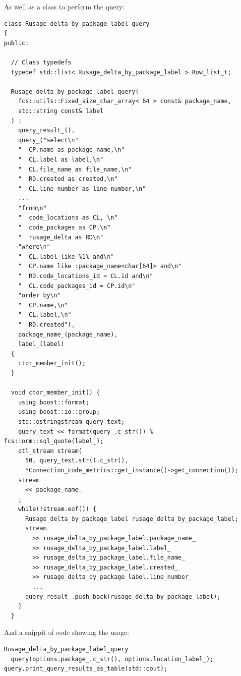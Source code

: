 \documentclass[11pt]{article}
\begin{document}
  
\pagebreak
    As well as a class to perform the query:


\lstset{language=C++}
\begin{lstlisting}
class Rusage_delta_by_package_label_query 
{
public:

  // Class typedefs
  typedef std::list< Rusage_delta_by_package_label > Row_list_t;

  Rusage_delta_by_package_label_query(
    fcs::utils::Fixed_size_char_array< 64 > const& package_name,
    std::string const& label
  ) :
    query_result_(),
    query_("select\n"
    "  CP.name as package_name,\n"
    "  CL.label as label,\n"
    "  CL.file_name as file_name,\n"
    "  RD.created as created,\n"
    "  CL.line_number as line_number,\n"
    ...
    "from\n"
    "  code_locations as CL, \n"
    "  code_packages as CP,\n"
    "  rusage_delta as RD\n"
    "where\n"
    "  CL.label like %1% and\n"
    "  CP.name like :package_name<char[64]> and\n"
    "  RD.code_locations_id = CL.id and\n"
    "  CL.code_packages_id = CP.id\n"
    "order by\n"
    "  CP.name,\n"
    "  CL.label,\n"
    "  RD.created"),
    package_name_(package_name),
    label_(label)
  {
    ctor_member_init();
  }

  void ctor_member_init() {
    using boost::format;
    using boost::io::group;
    std::ostringstream query_text;
    query_text << format(query_.c_str()) % fcs::orm::sql_quote(label_);
    otl_stream stream(
      50, query_text.str().c_str(),
      *Connection_code_metrics::get_instance()->get_connection());
    stream 
      << package_name_
    ;
    while(!stream.eof()) {
      Rusage_delta_by_package_label rusage_delta_by_package_label;
      stream
        >> rusage_delta_by_package_label.package_name_
        >> rusage_delta_by_package_label.label_
        >> rusage_delta_by_package_label.file_name_
        >> rusage_delta_by_package_label.created_
        >> rusage_delta_by_package_label.line_number_
        ...
      query_result_.push_back(rusage_delta_by_package_label);
    }
  }
\end{lstlisting}


    
\pagebreak

    And a snippit of code showing the usage:


\lstset{language=C++}
\begin{lstlisting}
Rusage_delta_by_package_label_query 
  query(options.package_.c_str(), options.location_label_);
query.print_query_results_as_table(std::cout);
\end{lstlisting}
\end{document}
